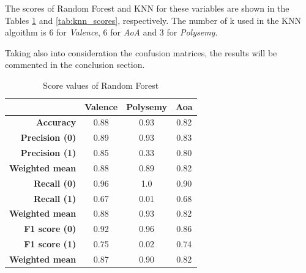\documentclass[a4paper,11pt,dvipsnames]{article}
\begin{document}
    The scores of Random Forest and KNN for these variables are shown in the Tables \ref{tab:rf_scores} and \ref{tab:knn_scores}, respectively. The number of k used in the KNN algoithm is 6 for \textit{Valence}, 6 for \textit{AoA} and 3 for \textit{Polysemy}.
    
Taking also into consideration the confusion matrices, the results will be commented in the conclusion section.
    

\begin{minipage}{0.49\linewidth}
    \centering
    \begin{table}[H]

    \centering
    \begin{tabular}{|r|c|c|c|}
    \hline
        & Valence & Polysemy & Aoa\\\hline\hline
        
        \textbf{Accuracy} & 0.88 & 0.93 & 0.82\\\hline
        
        \textbf{Precision (0)} & 0.89 & 0.93 & 0.83\\
        \textbf{Precision (1)} & 0.85 & 0.33 & 0.80\\
        \textbf{Weighted mean} & 0.88 & 0.89 & 0.82\\\hline
        
        \textbf{Recall (0)} & 0.96 & 1.0 & 0.90\\
        \textbf{Recall (1)} & 0.67 & 0.01 & 0.68\\
        \textbf{Weighted mean} & 0.88 & 0.93 & 0.82\\\hline
        
        \textbf{F1 score (0)} & 0.92 & 0.96 & 0.86\\
        \textbf{F1 score (1)} & 0.75 & 0.02 & 0.74\\
        \textbf{Weighted mean} & 0.87 & 0.90 & 0.82\\\hline
        
    \end{tabular}
            \caption{Score values of Random Forest}\label{tab:rf_scores}
    \end{table}
    \end{minipage}
    \hfil
\end{document}
